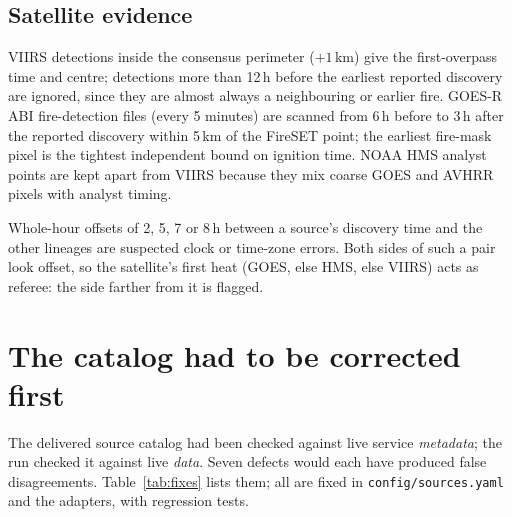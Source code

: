 \documentclass[11pt,a4paper]{article}
\begin{document}
\subsection{Satellite evidence}

VIIRS detections inside the consensus perimeter ($+1$\,km) give the first-overpass time and centre; detections
more than 12\,h before the earliest reported discovery are ignored, since they are almost always a neighbouring
or earlier fire. GOES-R ABI fire-detection files (every 5 minutes) are scanned from 6\,h before to 3\,h after
the reported discovery within 5\,km of the FireSET point; the earliest fire-mask pixel is the tightest
independent bound on ignition time. NOAA HMS analyst points are kept apart from VIIRS because they mix coarse
GOES and AVHRR pixels with analyst timing.

Whole-hour offsets of 2, 5, 7 or 8\,h between a source's discovery time and the other lineages are suspected
clock or time-zone errors. Both sides of such a pair look offset, so the satellite's first heat (GOES, else HMS,
else VIIRS) acts as referee: the side farther from it is flagged.

\section{The catalog had to be corrected first}
\label{sec:catalog}

The delivered source catalog had been checked against live service \emph{metadata}; the run checked it against
live \emph{data}. Seven defects would each have produced false disagreements. Table~\ref{tab:fixes} lists them;
all are fixed in \texttt{config/sources.yaml} and the adapters, with regression tests.
\end{document}
